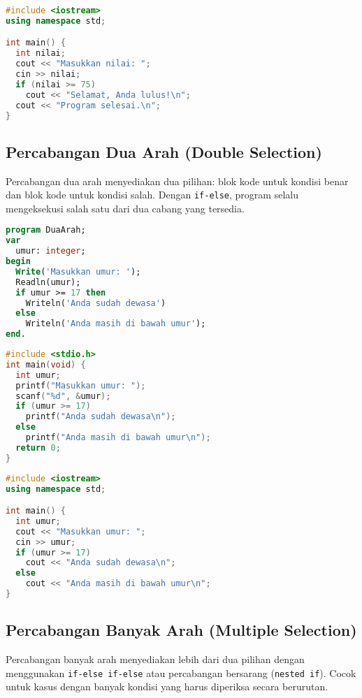 \documentclass[../main.tex]{subfiles}
\begin{document}
\begin{lstlisting}[language=C++, caption={Percabangan satu arah di C++}]
#include <iostream>
using namespace std;

int main() {
  int nilai;
  cout << "Masukkan nilai: ";
  cin >> nilai;
  if (nilai >= 75)
    cout << "Selamat, Anda lulus!\n";
  cout << "Program selesai.\n";
}
\end{lstlisting}

\subsection{Percabangan Dua Arah (Double Selection)}
Percabangan dua arah menyediakan dua pilihan: blok kode untuk kondisi benar dan blok kode untuk kondisi salah. Dengan \texttt{if-else}, program selalu mengeksekusi salah satu dari dua cabang yang tersedia.

\begin{lstlisting}[language=Pascal, caption={Percabangan dua arah di Pascal}]
program DuaArah;
var
  umur: integer;
begin
  Write('Masukkan umur: ');
  Readln(umur);
  if umur >= 17 then
    Writeln('Anda sudah dewasa')
  else
    Writeln('Anda masih di bawah umur');
end.
\end{lstlisting}

\begin{lstlisting}[language=C, caption={Percabangan dua arah di C}]
#include <stdio.h>
int main(void) {
  int umur;
  printf("Masukkan umur: ");
  scanf("%d", &umur);
  if (umur >= 17)
    printf("Anda sudah dewasa\n");
  else
    printf("Anda masih di bawah umur\n");
  return 0;
}
\end{lstlisting}

\begin{lstlisting}[language=C++, caption={Percabangan dua arah di C++}]
#include <iostream>
using namespace std;

int main() {
  int umur;
  cout << "Masukkan umur: ";
  cin >> umur;
  if (umur >= 17)
    cout << "Anda sudah dewasa\n";
  else
    cout << "Anda masih di bawah umur\n";
}
\end{lstlisting}

\subsection{Percabangan Banyak Arah (Multiple Selection)}
Percabangan banyak arah menyediakan lebih dari dua pilihan dengan menggunakan \texttt{if-else if-else} atau percabangan bersarang (\texttt{nested if}). Cocok untuk kasus dengan banyak kondisi yang harus diperiksa secara berurutan.
\end{document}
